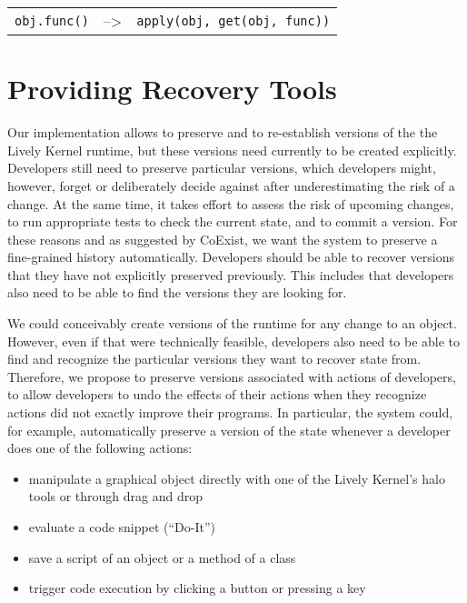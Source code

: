 \begin{center}
    \begin{tabular}{ lll }
    \lstinline|obj.func()| & --> & \lstinline|apply(obj, get(obj, func))| \\
    \end{tabular}
\end{center}



\section{Providing Recovery Tools}

Our implementation allows to preserve and to re-establish versions of the the Lively Kernel runtime, but these versions need currently to be created explicitly.
Developers still need to preserve particular versions, which developers might, however, forget or deliberately decide against after underestimating the risk of a change.
At the same time, it takes effort to assess the risk of upcoming changes, to run appropriate tests to check the current state, and to commit a version.
For these reasons and as suggested by CoExist, we want the system to preserve a fine-grained history automatically.
Developers should be able to recover versions that they have not explicitly preserved previously.
This includes that developers also need to be able to find the versions they are looking for.

We could conceivably create versions of the runtime for any change to an object.
However, even if that were technically feasible, developers also need to be able to find and recognize the particular versions they want to recover state from.
Therefore, we propose to preserve versions associated with actions of developers, to allow developers to undo the effects of their actions when they recognize actions did not exactly improve their programs.
In particular, the system could, for example, automatically preserve a version of the state whenever a developer does one of the following actions:
\begin{itemize}
    \item manipulate a graphical object directly with one of the Lively Kernel's halo tools or through drag and drop
    \item evaluate a code snippet (``Do-It'')
    \item save a script of an object or a method of a class
    \item trigger code execution by clicking a button or pressing a key
\end{itemize}

